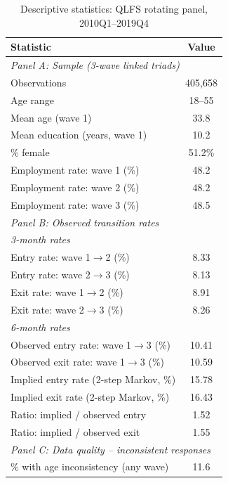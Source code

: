 \begin{table}[htbp]
\centering
\caption{Descriptive statistics: QLFS rotating panel, 2010Q1--2019Q4}
\label{tab:descriptive}
\begin{tabular}{lc}
\toprule
\textbf{Statistic} & \textbf{Value} \\
\midrule
\multicolumn{2}{l}{\textit{Panel A: Sample (3-wave linked triads)}} \\
Observations & 405,658 \\
Age range & 18--55 \\
Mean age (wave 1) & 33.8 \\
Mean education (years, wave 1) & 10.2 \\
\% female & 51.2\% \\
Employment rate: wave 1 (\%) & 48.2 \\
Employment rate: wave 2 (\%) & 48.2 \\
Employment rate: wave 3 (\%) & 48.5 \\
\midrule
\multicolumn{2}{l}{\textit{Panel B: Observed transition rates}} \\
\multicolumn{2}{l}{\quad\textit{3-month rates}} \\
\quad Entry rate: wave 1$\to$2 (\%) & 8.33 \\
\quad Entry rate: wave 2$\to$3 (\%) & 8.13 \\
\quad Exit rate: wave 1$\to$2 (\%) & 8.91 \\
\quad Exit rate: wave 2$\to$3 (\%) & 8.26 \\
\multicolumn{2}{l}{\quad\textit{6-month rates}} \\
\quad Observed entry rate: wave 1$\to$3 (\%) & 10.41 \\
\quad Observed exit rate: wave 1$\to$3 (\%) & 10.59 \\
\quad Implied entry rate (2-step Markov, \%) & 15.78 \\
\quad Implied exit rate (2-step Markov, \%) & 16.43 \\
\quad Ratio: implied / observed entry & 1.52 \\
\quad Ratio: implied / observed exit & 1.55 \\
\midrule
\multicolumn{2}{l}{\textit{Panel C: Data quality -- inconsistent responses}} \\
\% with age inconsistency (any wave) & 11.6 \\

\end{tabular}
\end{table}
